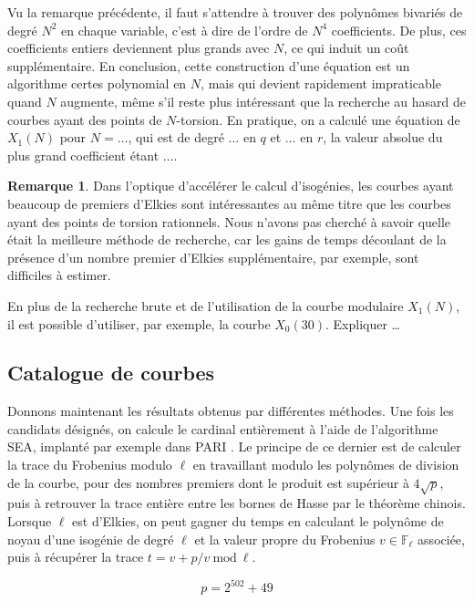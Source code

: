 \documentclass[11pt,a4paper]{article}
\newcommand{\F}{\mathbb{F}}
\renewcommand{\mod}{\ \mathrm{mod}\ }
\theoremstyle{definition}
\newtheorem*{rem}{Remarque}
\begin{document}
Vu la remarque précédente, il faut s'attendre à trouver des polynômes bivariés de degré $N^2$ en chaque variable, c'est à dire de l'ordre de $N^4$ coefficients. De plus, ces coefficients entiers deviennent plus grands avec $N$, ce qui induit un coût supplémentaire. En conclusion, cette construction d'une équation est un algorithme certes polynomial en $N$, mais qui devient rapidement impraticable quand $N$ augmente, même s'il reste plus intéressant que la recherche au hasard de courbes ayant des points de $N$-torsion. En pratique, on a calculé une équation de $X_1(N)$ pour $N = \dots$, qui est de degré $\dots$ en $q$ et $\dots$ en $r$, la valeur absolue du plus grand coefficient étant $\dots$.

\begin{rem}
Dans l'optique d'accélérer le calcul d'isogénies, les courbes ayant beaucoup de premiers d'Elkies sont intéressantes au même titre que les courbes ayant des points de torsion rationnels. Nous n'avons pas cherché à savoir quelle était la meilleure méthode de recherche, car les gains de temps découlant de la présence d'un nombre premier d'Elkies supplémentaire, par exemple, sont difficiles à estimer.

En plus de la recherche brute et de l'utilisation de la courbe modulaire $X_1(N)$, il est possible d'utiliser, par exemple, la courbe $X_0(30)$. Expliquer \dots
\end{rem}

\subsection{Catalogue de courbes}

Donnons maintenant les résultats obtenus par différentes méthodes. Une fois les candidats désignés, on calcule le cardinal entièrement à l'aide de l'algorithme SEA, implanté par exemple dans PARI \cite{PARI}. Le principe de ce dernier est de calculer la trace du Frobenius modulo $\ell$ en travaillant modulo les polynômes de division de la courbe, pour des nombres premiers dont le produit est supérieur à $4\sqrt{p}$, puis à retrouver la trace entière entre les bornes de Hasse par le théorème chinois. Lorsque $\ell$ est d'Elkies, on peut gagner du temps en calculant le polynôme de noyau d'une isogénie de degré $\ell$ et la valeur propre du Frobenius $v\in \F_\ell$ associée, puis à récupérer la trace $t = v + p/v \mod\ell.$


$$p = 2^{502} + 49$$
\end{document}
